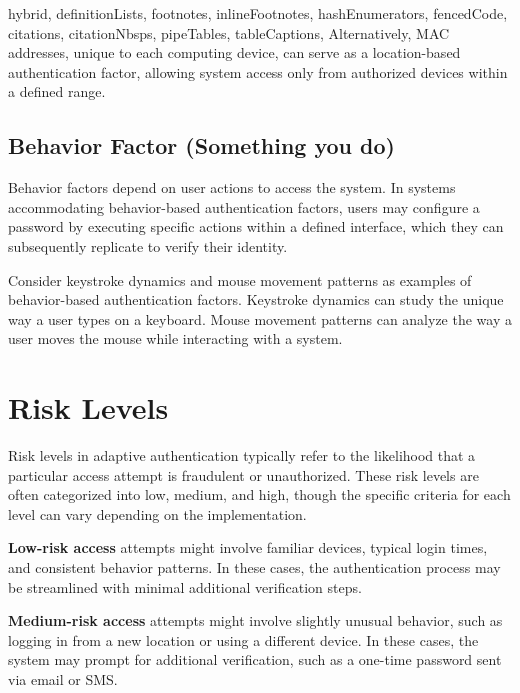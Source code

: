 \documentclass[
  digital,     %
  oneside,     %
  nosansbold,  %
  nocolorbold, %
  lof,         %
  lot,         %
]{fithesis4}
\begin{document}
\begin{markdown*}{%
  hybrid,
  definitionLists,
  footnotes,
  inlineFootnotes,
  hashEnumerators,
  fencedCode,
  citations,
  citationNbsps,
  pipeTables,
  tableCaptions,
}
Alternatively, MAC addresses, unique to each computing device, can serve as a location-based authentication factor, allowing system access only from authorized devices within a defined range.

\newpage
\subsection{Behavior Factor (Something you do)}
Behavior factors depend on user actions to access the system. In systems accommodating behavior-based authentication factors, users may configure a password by executing specific actions within a defined interface, which they can subsequently replicate to verify their identity.

Consider keystroke dynamics and mouse movement patterns as examples of behavior-based authentication factors.
Keystroke dynamics can study the unique way a user types on a keyboard.
Mouse movement patterns can analyze the way a user moves the mouse while interacting with a system. \cite{auth-factors-aratek} \cite{auth-factors-sumologic} \cite{auth-factors-globalknowledge} 


\newpage
\section{Risk Levels}
Risk levels in adaptive authentication typically refer to the likelihood that a particular access attempt is fraudulent or unauthorized.
These risk levels are often categorized into low, medium, and high, though the specific criteria for each level can vary depending on the implementation.

\textbf{Low-risk access} attempts might involve familiar devices, typical login times, and consistent behavior patterns. In these cases, the authentication process may be streamlined with minimal additional verification steps.

\textbf{Medium-risk access} attempts might involve slightly unusual behavior, such as logging in from a new location or using a different device.
In these cases, the system may prompt for additional verification, such as a one-time password sent via email or SMS.


\end{markdown*}
\end{document}
